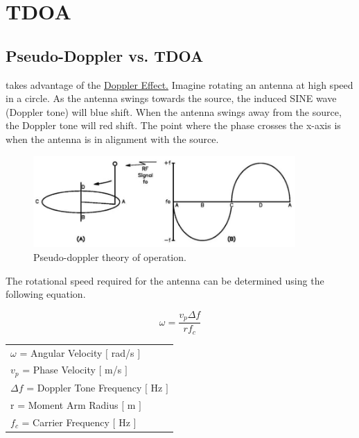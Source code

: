 \documentclass[12pt]{article}
\begin{document}
\renewcommand*\contentsname{Summary}
\tableofcontents
\pagebreak


\section{TDOA}

\subsection{Pseudo-Doppler vs. TDOA}

 takes advantage of the \href{<http://www.dailymotion.com/video/x1h5ogx_carl-sagan-s-cosmos-e10-the-edge-of-forever_tv>}{Doppler Effect.} Imagine rotating an antenna at high speed in a circle. As the antenna swings towards the source, the induced SINE wave (Doppler tone) will blue shift. When the antenna swings away from the source, the Doppler tone will red shift. The point where the phase crosses the x-axis is when the antenna is in alignment with the source.\\

\begin{figure}[!h]
	\centering
	\includegraphics[width=10.0cm]{Pics_and_Figs/Pseudo_Doppler_Theory_of_Operation.png}
    \caption{Pseudo-doppler theory of operation.} \label{fig:Doppler Theory of Operation}
\end{figure}

\noindent The rotational speed required for the antenna can be determined using the following equation.

\[\omega = \frac{v_p  \Delta f}{r f_c}\]

\begin{center}
\begin{tabular}{l}
$\omega$ = Angular Velocity $[$ rad/s $]$\\
$v_p$ = Phase Velocity $[$ m/s $]$\\
$\Delta f$ = Doppler Tone Frequency $[$ Hz $]$\\
r = Moment Arm Radius $[$ m $]$\\
$f_c$ = Carrier Frequency $[$ Hz $]$\\
\end{tabular}
\end{center}
\end{document}
